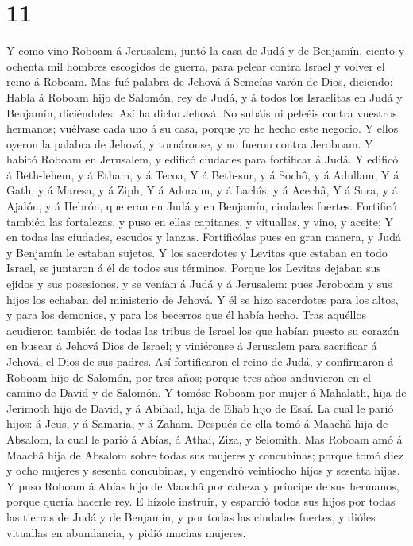 \hypertarget{section-10}{%
\section{11}\label{section-10}}

 Y como vino Roboam á Jerusalem, juntó la casa de Judá y
de Benjamín, ciento y ochenta mil hombres escogidos de guerra, para
pelear contra Israel y volver el reino á Roboam.  Mas fué
palabra de Jehová á Semeías varón de Dios, diciendo: 
Habla á Roboam hijo de Salomón, rey de Judá, y á todos los Israelitas en
Judá y Benjamín, diciéndoles:  Así ha dicho Jehová: No
subáis ni peleéis contra vuestros hermanos; vuélvase cada uno á su casa,
porque yo he hecho este negocio. Y ellos oyeron la palabra de Jehová, y
tornáronse, y no fueron contra Jeroboam.  Y habitó Roboam
en Jerusalem, y edificó ciudades para fortificar á Judá. 
Y edificó á Beth-lehem, y á Etham, y á Tecoa,  Y á
Beth-sur, y á Sochô, y á Adullam,  Y á Gath, y á Maresa, y
á Ziph,  Y á Adoraim, y á Lachîs, y á Acechâ,
 Y á Sora, y á Ajalón, y á Hebrón, que eran en Judá y en
Benjamín, ciudades fuertes.  Fortificó también las
fortalezas, y puso en ellas capitanes, y vituallas, y vino, y aceite;
 Y en todas las ciudades, escudos y lanzas. Fortificólas
pues en gran manera, y Judá y Benjamín le estaban sujetos.
 Y los sacerdotes y Levitas que estaban en todo Israel,
se juntaron á él de todos sus términos.  Porque los
Levitas dejaban sus ejidos y sus posesiones, y se venían á Judá y á
Jerusalem: pues Jeroboam y sus hijos los echaban del ministerio de
Jehová.  Y él se hizo sacerdotes para los altos, y para
los demonios, y para los becerros que él había hecho. 
Tras aquéllos acudieron también de todas las tribus de Israel los que
habían puesto su corazón en buscar á Jehová Dios de Israel; y viniéronse
á Jerusalem para sacrificar á Jehová, el Dios de sus padres.
 Así fortificaron el reino de Judá, y confirmaron á
Roboam hijo de Salomón, por tres años; porque tres años anduvieron en el
camino de David y de Salomón.  Y tomóse Roboam por mujer
á Mahalath, hija de Jerimoth hijo de David, y á Abihail, hija de Eliab
hijo de Esaí.  La cual le parió hijos: á Jeus, y á
Samaria, y á Zaham.  Después de ella tomó á Maachâ hija
de Absalom, la cual le parió á Abías, á Athai, Ziza, y Selomith.
 Mas Roboam amó á Maachâ hija de Absalom sobre todas sus
mujeres y concubinas; porque tomó diez y ocho mujeres y sesenta
concubinas, y engendró veintiocho hijos y sesenta hijas. 
Y puso Roboam á Abías hijo de Maachâ por cabeza y príncipe de sus
hermanos, porque quería hacerle rey.  E hízole instruir,
y esparció todos sus hijos por todas las tierras de Judá y de Benjamín,
y por todas las ciudades fuertes, y dióles vituallas en abundancia, y
pidió muchas mujeres.

